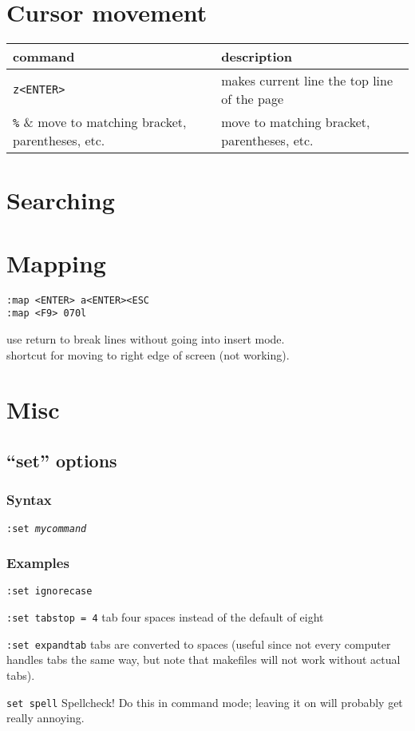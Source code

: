 \documentclass{article}
\begin{document}
\section{Cursor movement}

\begin{tabular}{l l}
    \textbf{command} & \textbf{description}\\
    \hline
    \verb|z<ENTER>| & makes current line the top line of the page\\
    \verb|%| & move to matching bracket, parentheses, etc.\\
\end{tabular}

\section{Searching}

\section{Mapping}
\begin{minipage}[t]{0.4\textwidth}
    \texttt{:map <ENTER> a<ENTER><ESC}\\
    \texttt{:map <F9> 070l}\\
\end{minipage}
\begin{minipage}[t]{0.7\textwidth}
    use return to break lines without going into insert mode.\\
    shortcut for moving to right edge of screen (not working).\\
\end{minipage}

\section{Misc}

\subsection{``set'' options}
\subsubsection{Syntax}
\texttt{:set \emph{mycommand}}
\subsubsection{Examples}
\par\texttt{:set ignorecase}
\par\texttt{:set tabstop = 4} tab four spaces instead of the default of eight
\par\texttt{:set expandtab} tabs are converted to spaces (useful since not every
computer handles tabs the same way, but note that makefiles will not
work without actual tabs).
\par\texttt{set spell} Spellcheck! Do this in command mode; leaving it on
will probably get really annoying.
\end{document}
